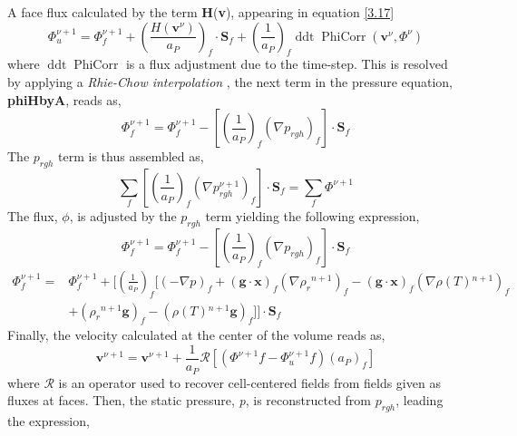 A face flux calculated by the term \textbf{H}(\textbf{v}), appearing in equation \ref{3.17}
\begin{equation}
	\Phi_{u}^{\nu+1}=\Phi_{f}^{\nu+1} + \left(\frac{H\left(\textbf{v}^{\nu}\right)}{a_{P}}\right)_{f} \cdot \textbf{S}_{f}+\left(\frac{1}{a_{P}}\right)_{f}\operatorname{ddt} \operatorname{PhiCorr}\left(\textbf{v}^{\nu}, \Phi^{\nu}\right)
	\label{3.22}
\end{equation}
where $\operatorname{ddt} \operatorname{PhiCorr}$ is a flux adjustment due to the time-step. This is resolved by applying a \textit{Rhie-Chow interpolation} \cite{rhie_chow_1983}, the next term in the pressure equation, \textbf{phiHbyA}, reads as,
\begin{equation}
	\Phi_{f}^{\nu+1}=\Phi_{f}^{\nu+1}-\left[\left(\frac{1}{a_{P}}\right)_{f}\left(\nabla p_{r g h}\right)_{f}\right] \cdot \textbf{S}_{f}
	\label{3.23}
\end{equation}
The \textbf{$p_{rgh}$} term is thus assembled as,
\begin{equation}
	\sum_{f}\left[\left(\frac{1}{a_{P}}\right)_{f}\left(\nabla p_{r g h}^{\nu+1}\right)_{f}\right] \cdot \textbf{S}_{f}=\sum_{f} \Phi^{\nu+1}
	\label{3.24}
\end{equation}
The flux, \textit{$\phi$}, is adjusted by the \textbf{$p_{rgh}$} term yielding the following expression,
\begin{equation}
	\Phi_{f}^{\nu+1}=\Phi_{f}^{\nu+1}-\left[\left(\frac{1}{a_{P}}\right)_{f}\left(\nabla p_{r g h}\right)_{f}\right] \cdot \textbf{S}_{f}
	\label{3.25}
\end{equation}
\begin{equation}
	\begin{aligned}
		\Phi_{f}^{\nu+1}=&\Phi_{f}^{\nu+1}+\biggl[\left(\frac{1}{a_{P}}\right)_{f}\biggl[(-\nabla p)_{f}+ (\textbf{g} \cdot \textbf{x})_{f}\left(\nabla \rho_{r}{ }^{n+1}\right)_{f}-(\textbf{g} \cdot \textbf{x})_{f}\left(\nabla \rho(T){ }^{n+1}\right)_{f}\\
		&+ (\rho_{r}{ }^{n+1} \textbf{g})_{f}-(\rho(T){ }^{n+1} \textbf{g})_{f} \biggr]\biggr] \cdot \textbf{S}_{f}
	\end{aligned}
	\label{3.26}
\end{equation}
Finally, the velocity calculated at the center of the volume reads as,
\begin{equation}
	\textbf{v}^{\nu+1}=\textbf{v}^{\nu+1} +\frac{1}{a_{P}}\mathcal{R}\left[\left(\Phi^{\nu+1} f-\Phi_{u}^{\nu+1} f\right)\left(a_{P}\right)_{f}\right]
	\label{3.27}
\end{equation}
where $\mathcal{R}$ is an operator used to recover cell-centered fields from fields given as fluxes at faces.
Then, the static pressure, \textit{p}, is reconstructed from \textit{$p_{rgh}$}, leading the expression,

